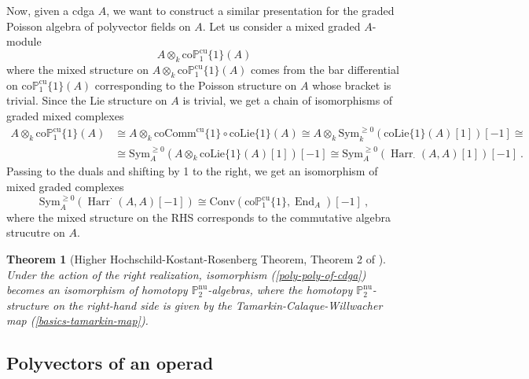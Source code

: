 \documentclass[10pt, oneside]{amsart}
\theoremstyle{plain}
\newtheorem{theorem}[equation]{Theorem}
\newcommand{\colie}{\mathrm{coLie}}
\newcommand{\conv}{\mathrm{Conv}}
\DeclareMathOperator{\en}{End}
\DeclareMathOperator{\harr}{Harr}
\renewcommand{\nu}{\mathrm{nu}}
\newcommand{\PP}{\mathbb{P}}
\newcommand{\sym}{\mathrm{Sym}}
\newcommand{\cucoP}{\mathrm{co}\PP^{\text{cu}}}
\newcommand{\cuccomm}{\mathrm{coComm}^\mathrm{cu}}
\begin{document}
Now, given a cdga $A$, we want to construct a similar presentation for the graded Poisson algebra of polyvector fields on $A$.
Let us consider a mixed graded $A$-module
\begin{equation*}
A \otimes_k \cucoP_1\{1\}(A)
\end{equation*}
where the mixed structure on $A \otimes_k \cucoP_1\{1\}(A)$ comes from the bar differential on $\cucoP_1\{1\}(A)$ corresponding to
the Poisson structure on $A$ whose bracket is trivial. Since the Lie structure on $A$ is trivial, we get a chain
of isomorphisms of graded mixed complexes
\begin{equation*}
\begin{split}
A \otimes_k \cucoP_1\{1\}(A) &\cong A \otimes_k \cuccomm\{1\} \circ \colie\{1\}(A) \cong A \otimes_k \text{Sym}^{\ge 0}_k ( \colie\{1\}(A)[1] ) [-1] \cong \\
&\cong \text{Sym}^{\ge 0}_A (A \otimes_k \colie\{1\}(A)[1]) [-1] \cong \text{Sym}^{\ge 0}_A ( \harr_\cdot(A,A) [1] ) [-1] \:.
\end{split}
\end{equation*}
Passing to the duals and shifting by 1 to the right, we get an isomorphism of mixed graded complexes
\begin{equation}\label{poly-poly-of-cdga}
\sym_A^{\ge 0} (\harr^\cdot(A,A)[-1]) \cong \conv(\cucoP_1\{1\}, \en_A) [-1] \:,
\end{equation}
where the mixed structure on the RHS corresponds to the commutative algebra strucutre on $A$.

\begin{theorem}[Higher Hochschild-Kostant-Rosenberg Theorem, Theorem 2 of \cite{Calaque_2015}]\label{Calaque-Willwacher-thm}
Under the action of the right realization, isomorphism (\ref{poly-poly-of-cdga}) becomes an isomorphism of homotopy
$\PP_2^\nu$-algebras, where the homotopy $\PP_2^\nu$-structure on the right-hand side is given by the
Tamarkin-Calaque-Willwacher map (\ref{basics-tamarkin-map}).
\end{theorem}


\subsection{Polyvectors of an operad}\label{sec4.2}
\end{document}
